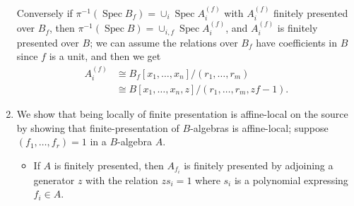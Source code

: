 \documentclass{report}
\DeclareMathOperator{\Spec}{Spec}
\begin{document}
\begin{enumerate}[label=\textbf{7.3.\Alph*.}]
	      Conversely if $\pi^{-1}(\Spec B_f)=\cup_i\Spec A^{(f)}_i$ with
	      $A^{(f)}_i$ finitely presented over $B_f$, then
	      $\pi^{-1}(\Spec B)=\cup_{i,f}\Spec A^{(f)}_i$, and $A^{(f)}_i$ is
	      finitely presented over $B$; we can assume the relations over $B_f$
	      have coefficients in $B$ since $f$ is a unit, and then we get
	      \begin{align*}
		      A^{(f)}_i
		       & \cong B_f[x_1,\ldots,x_n]/(r_1,\ldots,r_m)       \\
		       & \cong B[x_1,\ldots,x_n,z]/(r_1,\ldots,r_m,zf-1).
	      \end{align*}

	\item We show that being locally of finite presentation is affine-local on
	      the source by showing that finite-presentation of $B$-algebras is
	      affine-local; suppose $(f_1,\ldots,f_r)=1$ in a $B$-algebra $A$.
	      \begin{itemize}
		      \item If $A$ is finitely presented, then $A_{f_i}$ is finitely
		            presented by adjoining a generator $z$ with the relation
		            $zs_i=1$ where $s_i$ is a polynomial expressing $f_i\in A$.


\end{itemize}
\end{enumerate}
\end{document}
